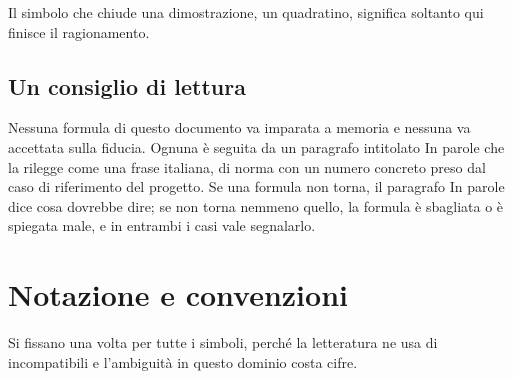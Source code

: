 \documentclass[11pt,a4paper]{article}
\theoremstyle{definition}
\theoremstyle{plain}
\begin{document}
Il simbolo che chiude una dimostrazione, un quadratino, significa soltanto qui finisce il ragionamento.

\subsection{Un consiglio di lettura}

Nessuna formula di questo documento va imparata a memoria e nessuna va accettata sulla fiducia. Ognuna è seguita da un paragrafo intitolato In parole che la rilegge come una frase italiana, di norma con un numero concreto preso dal caso di riferimento del progetto. Se una formula non torna, il paragrafo In parole dice cosa dovrebbe dire; se non torna nemmeno quello, la formula è sbagliata o è spiegata male, e in entrambi i casi vale segnalarlo.

\section{Notazione e convenzioni}

Si fissano una volta per tutte i simboli, perché la letteratura ne usa di incompatibili e l'ambiguità in questo dominio costa cifre.
\end{document}
